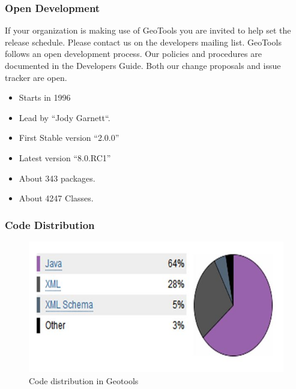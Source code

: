\subsubsection{Open Development}
If your organization is making use of GeoTools you are invited to help set the release schedule. Please contact us on the developers mailing list.
GeoTools follows an open development process. Our policies and procedures are documented in the Developers Guide. Both our change proposals and issue tracker are open.

\begin{itemize}
\item Starts in 1996
\item Lead by “Jody Garnett“.
\item First Stable version “2.0.0”
\item Latest version “8.0.RC1”
\item About 343 packages.
\item About 4247 Classes.
\end{itemize}

\subsubsection{Code Distribution}

\begin{figure}[h]
\begin{center}
  \includegraphics [scale=0.9] {codedistribution.jpg}
  \caption[Code Distribution Geotools]{Code distribution in Geotools}
\end{center}
\end{figure}

